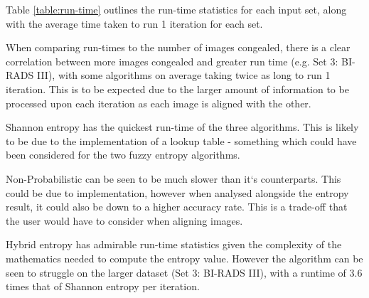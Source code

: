 Table \ref{table:run-time} outlines the run-time statistics for each input set, along with the average time taken to run 1 iteration for each set.

When comparing run-times to the number of images congealed, there is a clear correlation between more images congealed and greater run time (e.g. Set 3: BI-RADS III), with some algorithms on average taking twice as long to run 1 iteration. This is to be expected due to the larger amount of information to be processed upon each iteration as each image is aligned with the other.

Shannon entropy has the quickest run-time of the three algorithms. This is likely to be due to the implementation of a lookup table - something which could have been considered for the two fuzzy entropy algorithms.

Non-Probabilistic can be seen to be much slower than it`s counterparts. This could be due to implementation, however when analysed alongside the entropy result, it could also be down to a higher accuracy rate. This is a trade-off that the user would have to consider when aligning images.

Hybrid entropy has admirable run-time statistics given the complexity of the mathematics needed to compute the entropy value. However the algorithm can be seen to struggle on the larger dataset (Set 3: BI-RADS III), with a runtime of 3.6 times that of Shannon entropy per iteration.
